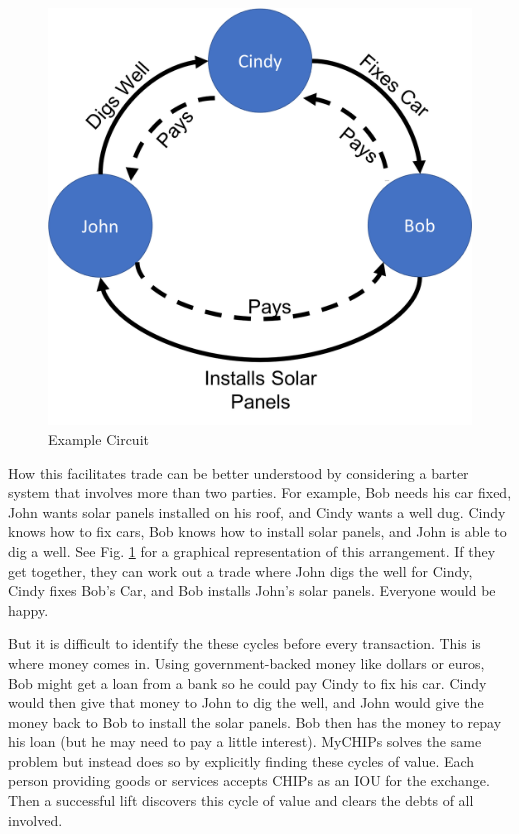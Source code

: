 \documentclass[article, onecolumn, 12pt]{IEEEtran}
\begin{document}
\begin{figure}[H]
    \centering
    \includegraphics[scale=0.3]{ExampleCircuit.png}
    \caption{Example Circuit}
    \label{fig:liftProt}
\end{figure}
How this facilitates trade can be better understood by considering a barter system that involves more than two parties. 
For example, Bob needs his car fixed, John wants solar panels installed on his roof, and Cindy wants a well dug. Cindy knows how to fix cars, Bob knows how to install solar panels, and John is able to dig a well. See Fig. \ref{fig:liftProt} for a graphical representation of this arrangement. If they get together, they can work out a trade where John digs the well for Cindy, Cindy fixes Bob's Car, and Bob installs John's solar panels. Everyone would be happy.

But it is difficult to identify the these cycles before every transaction. This is where money comes in. Using government-backed money like dollars or euros, Bob might get a loan from a bank so he could pay Cindy to fix his car. Cindy would then give that money to John to dig the well, and John would give the money back to Bob to install the solar panels. Bob then has the money to repay his loan (but he may need to pay a little interest). MyCHIPs solves the same problem but instead does so by explicitly finding these cycles of value. Each person providing goods or services accepts CHIPs as an IOU for the exchange. Then a successful lift discovers this cycle of value and clears the debts of all involved.
\end{document}
